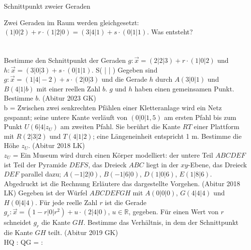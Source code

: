\setcounter{aufgabe}{12}

\begin{aufgabe}{Schnittpunkt zweier Geraden}
\begin{teile}
\teil Zwei Geraden im Raum werden gleichgesetzt: $(1|0|2) + r \cdot (1|2|0) = (3|4|1) + s \cdot (0|1|1)$. Was entsteht? \\  \\  \\ 
\teil Bestimme den Schnittpunkt der Geraden $g: \vec{x} = (2|2|3) + r \cdot (1|0|2)$ und $h: \vec{x} = (3|0|3) + s \cdot (0|1|1)$. S( \leerfeld | \leerfeld | \leerfeld )
\teil Gegeben sind $g: \vec{x} = (1|4|-2) + s \cdot (2|0|3)$ und die Gerade $h$ durch $A(3|0|1)$ und $B(4|1|b)$ mit einer reellen Zahl $b$. $g$ und $h$ haben einen gemeinsamen Punkt. Bestimme $b$. \hfill (Abitur 2023 GK) \\ b = \leerfeld
\teil Zwischen zwei senkrechten Pfählen einer Kletteranlage wird ein Netz gespannt; seine untere Kante verläuft von $(0|0|1{,}5)$ am ersten Pfahl bis zum Punkt $U(6|4|z_U)$ am zweiten Pfahl. Sie berührt die Kante $RT$ einer Plattform mit $R(2|3|2)$ und $T(4|1|2)$; eine Längeneinheit entspricht 1 m. Bestimme die Höhe $z_U$. \hfill (Abitur 2018 LK) \\ $z_U$ = \leerfeld
\teil Ein Museum wird durch einen Körper modelliert: der untere Teil $ABCDEF$ ist Teil der Pyramide $DEFS$, das Dreieck $ABC$ liegt in der $xy$-Ebene, das Dreieck $DEF$ parallel dazu; $A(-1|2|0)$, $B(-1|6|0)$, $D(1|0|6)$, $E(1|8|6)$. Abgedruckt ist die Rechnung  Erläutere das dargestellte Vorgehen. \hfill (Abitur 2018 LK)
\teil Gegeben ist der Würfel $ABCDEFGH$ mit $A(0|0|0)$, $G(4|4|4)$ und $H(0|4|4)$. Für jede reelle Zahl $r$ ist die Gerade $g_r: \vec{x} = (1 - r|0|r^2) + u \cdot (2|4|0)$, $u \in \mathbb{R}$, gegeben. Für einen Wert von $r$ schneidet $g_r$ die Kante $GH$. Bestimme das Verhältnis, in dem der Schnittpunkt die Kante $GH$ teilt. \hfill (Abitur 2019 GK) \\ HQ : QG = \leerfeld : \leerfeld
\end{teile}
\end{aufgabe}

